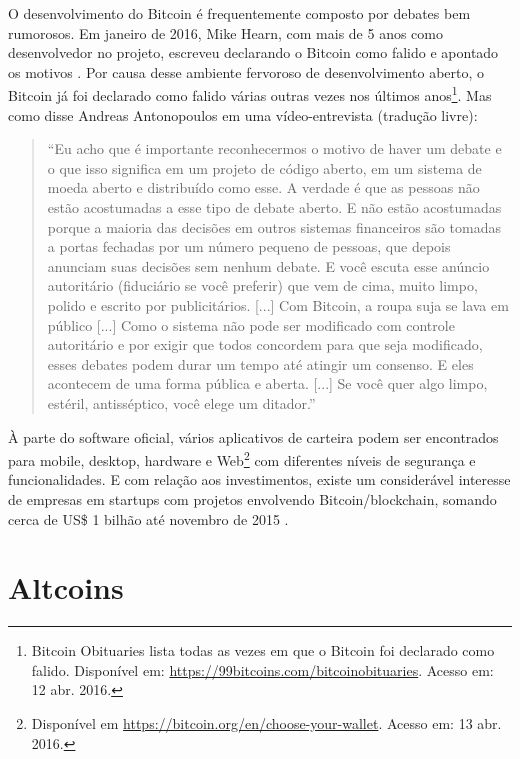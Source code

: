 O desenvolvimento do Bitcoin é frequentemente composto por debates bem rumorosos. Em janeiro de 2016, Mike Hearn, com mais de 5 anos como desenvolvedor no projeto, escreveu declarando o Bitcoin como falido e apontado os motivos \cite{bib:mike-hearn}. Por causa desse ambiente fervoroso de desenvolvimento aberto, o Bitcoin já foi declarado como falido várias outras vezes nos últimos anos\footnote{Bitcoin Obituaries lista todas as vezes em que o Bitcoin foi declarado como falido. Disponível em: \url{https://99bitcoins.com/bitcoinobituaries}. Acesso em: 12 abr. 2016.}. Mas como disse Andreas Antonopoulos em uma vídeo-entrevista \cite{bib:entrevista-andreas} (tradução livre):
\begin{quote}
``Eu acho que é importante reconhecermos o motivo de haver um debate e o que isso significa em um projeto de código aberto, em um sistema de moeda aberto e distribuído como esse. A verdade é que as pessoas não estão acostumadas a esse tipo de debate aberto. E não estão acostumadas porque a maioria das decisões em outros sistemas financeiros são tomadas a portas fechadas por um número pequeno de pessoas, que depois anunciam suas decisões sem nenhum debate. E você escuta esse anúncio autoritário (fiduciário se você preferir) que vem de cima, muito limpo, polido e escrito por publicitários. [...] Com Bitcoin, a roupa suja se lava em público [...] Como o sistema não pode ser modificado com controle autoritário e por exigir que todos concordem para que seja modificado, esses debates podem durar um tempo até atingir um consenso. E eles acontecem de uma forma pública e aberta. [...] Se você quer algo limpo, estéril, antisséptico, você elege um ditador.''
\end{quote}

À parte do software oficial, vários aplicativos de carteira podem ser encontrados para mobile, desktop, hardware e Web\footnote{Disponível em \url{https://bitcoin.org/en/choose-your-wallet}. Acesso em: 13 abr. 2016.} com diferentes níveis de segurança e funcionalidades. E com relação aos investimentos, existe um considerável interesse de empresas em startups com projetos envolvendo Bitcoin/blockchain, somando cerca de US\$ 1 bilhão até novembro de 2015 \cite{bib:investimentos}.

\section{Altcoins}

